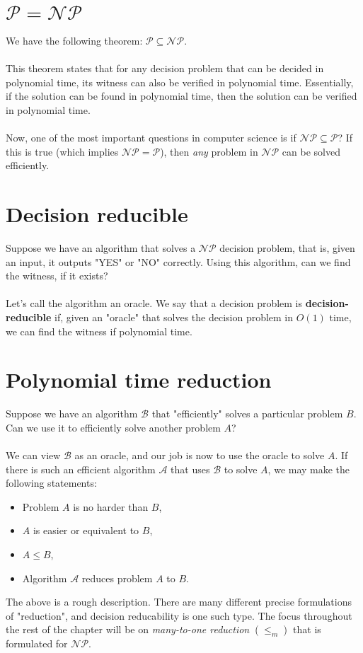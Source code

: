 \documentclass[a4paper]{article}
\begin{document}
\section{$\mathcal{P} = \mathcal{NP}$}
We have the following theorem: $\mathcal{P} \subseteq \mathcal{NP}$.\\\\
This theorem states that for any decision problem that can be decided in polynomial time, its witness can also be verified in polynomial time. Essentially, if the solution can be found in polynomial time, then the solution can be verified in polynomial time.\\\\
Now, one of the most important questions in computer science is if $\mathcal{NP} \subseteq \mathcal{P}$? If this is true (which implies $\mathcal{NP} = \mathcal{P}$), then \textit{any} problem in $\mathcal{NP}$ can be solved efficiently.

\section{Decision reducible}
Suppose we have an algorithm that solves a $\mathcal{NP}$ decision problem, that is, given an input, it outputs "YES" or "NO" correctly. Using this algorithm, can we find the witness, if it exists?\\\\
Let's call the algorithm an oracle. We say that a decision problem is \textbf{decision-reducible} if, given an "oracle" that solves the decision problem in $O(1)$ time, we can find the witness if polynomial time.

\section{Polynomial time reduction}
Suppose we have an algorithm $\mathcal{B}$ that "efficiently" solves a particular problem $B$. Can we use it to efficiently solve another problem $A$?\\\\
We can view $\mathcal{B}$ as an oracle, and our job is now to use the oracle to solve $A$. If there is such an efficient algorithm $\mathcal{A}$ that uses $\mathcal{B}$ to solve $A$, we may make the following statements:
\begin{itemize}
	\itemsep0em
	\item Problem $A$ is no harder than $B$,
	\item $A$ is easier or equivalent to $B$,
	\item $A \le B$,
	\item Algorithm $\mathcal{A}$ reduces problem $A$ to $B$.
\end{itemize}
The above is a rough description. There are many different precise formulations of "reduction", and  decision reducability is one such type. The focus throughout the rest of the chapter will be on \textit{many-to-one reduction} $(\le_m)$ that is formulated for $\mathcal{NP}$.
\end{document}
